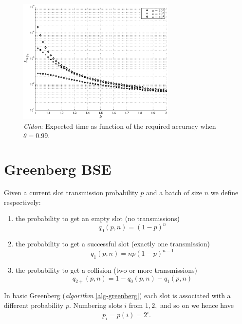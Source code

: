\documentclass[11pt,a4paper,twoside,openright]{book}
\begin{document}
\begin{figure}[htb!]
\begin{center}
\includegraphics[width=0.7\textwidth]{matlab/Cidon/cidon-k-L-minimum}
\caption[\emph{Cidon}: Expected time as function of the required accuracy]{\emph{Cidon}: Expected time as function of the required accuracy when $\theta=0.99$.}
\label{cidon-k-L-minimum}
\end{center}
\end{figure}

\section{Greenberg BSE}
Given a current slot transmission probability $p$ and a batch of size $n$ we define respectively:
\begin{enumerate}
\item the probability to get an empty slot (no transmissions)
\begin{equation}q_{0}(p,n)=(1-p)^{n} \label{eq:greenberg-prob-empty}\end{equation}
\item the probability to get a successful slot (exactly one transmission)
\begin{equation}q_{1}(p,n)=n p (1-p)^{n-1} \label{eq:greenberg-prob-succ}\end{equation} 
\item the probability to get a collision (two or more transmissions)
\begin{equation}q_{2+}(p,n)=1-q_{0}(p,n)-q_{1}(p,n)\label{eq:greenberg-prob-coll}\end{equation}
\end{enumerate}

In basic Greenberg (\emph{algorithm} \ref{alg-greenberg}) each slot is associated with a different probability $p$. Numbering slots $i$ from $1, 2,$ and so on we hence have
\begin{equation}
	p_{i}=p(i)=2^{i}.
\end{equation}
\end{document}
